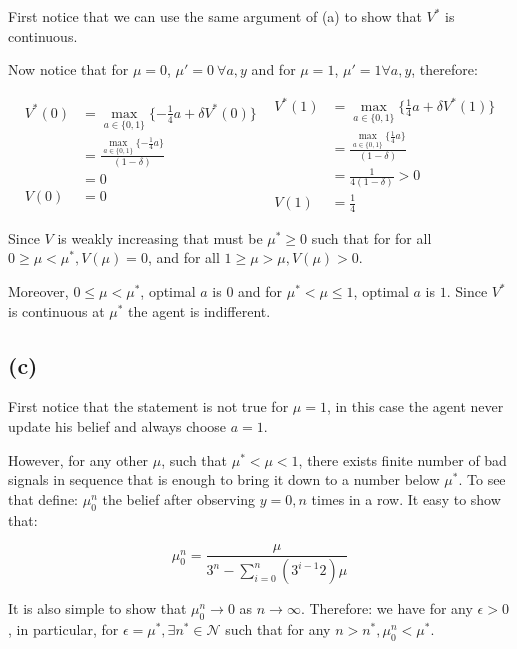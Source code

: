 \documentclass{article}
\begin{document}
First notice that we can use the same argument of (a) to show that $V^*$ is continuous.

Now notice that for $\mu = 0$, $\mu' = 0\ \forall a,y$ and for $\mu = 1$,
$\mu' = 1 \forall a,y$, therefore:

\[
  \begin{split}
    V^*(0) & =  \max_{a \in \{0, 1\}}\{- \frac{1}{4}a + \delta V^*(0) \} \\
           & = \frac{\max_{a \in \{0, 1\}}\{- \frac{1}{4}a\}}{(1 - \delta)} \\
           & = 0 \\
    V(0)   & = 0
  \end{split}
  \ \    
  \begin{split}
    V^*(1) & =  \max_{a \in \{0, 1\}}\{\frac{1}{4}a + \delta V^*(1) \} \\
           & = \frac{\max_{a \in \{0, 1\}}\{\frac{1}{4}a\}}{(1 - \delta)} \\
           & = \frac{1}{4(1 - \delta)} > 0 \\
    V(1)   & = \frac{1}{4}
  \end{split}
\]

Since $V$ is weakly increasing that must be $\mu^* \ge 0$ such that for for all 
$0 \ge \mu < \mu^*, V(\mu) = 0$, and for all $1 \ge \mu > \mu, V(\mu) > 0$.

Moreover, $0 \le \mu < \mu^*$, optimal $a$ is $0$ and for $\mu^* < \mu \le 1$, 
optimal $a$ is $1$. Since $V^*$ is continuous at $\mu^*$ the agent is indifferent.

\subsection{(c)} %

First notice that the statement is not true for $\mu = 1$, in this case the agent
never update his belief and always choose $a = 1$.

However, for any other $\mu$, such that $\mu^* < \mu < 1$, there exists finite number of bad signals
in sequence that is enough to bring it down to a number below $\mu^*$. To see that define:
$\mu_0^n$ the belief after observing $y = 0, n$ times in a row. It easy to show that:

\[
  \mu_0^n = \frac{\mu}{3^n - \sum_{i = 0}^n(3^{i-1}2)\mu}
\]

It is also simple to show that $\mu_0^n \to 0$ as $n \to \infty$. Therefore:
we have for any $\epsilon > 0$, in particular, for $\epsilon = \mu^*, \exists
n^* \in \mathcal{N}$ such that for any $n > n^*, \mu_0^n < \mu^*$.
\end{document}
